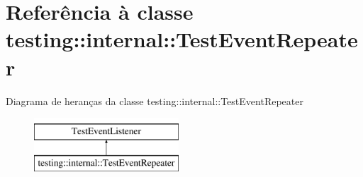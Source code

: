 \hypertarget{classtesting_1_1internal_1_1TestEventRepeater}{\section{Referência à classe testing\-:\-:internal\-:\-:Test\-Event\-Repeater}
\label{classtesting_1_1internal_1_1TestEventRepeater}
}
Diagrama de heranças da classe testing\-:\-:internal\-:\-:Test\-Event\-Repeater\begin{figure}[H]
\begin{center}
\leavevmode
\includegraphics[height=2.000000cm]{classtesting_1_1internal_1_1TestEventRepeater}
\end{center}
\end{figure}
